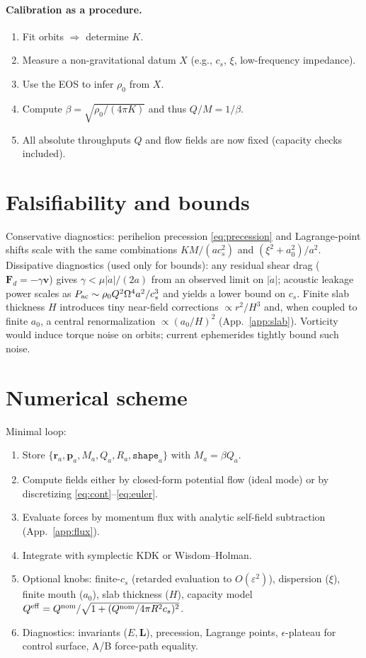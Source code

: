 \documentclass[11pt]{article}
\numberwithin{equation}{section}
\theoremstyle{plain}
\theoremstyle{remark}
\theoremstyle{definition}
\begin{document}
\paragraph{Calibration as a procedure.}
\begin{enumerate}[label=\arabic*)]
\item Fit orbits $\Rightarrow$ determine $K$.
\item Measure a non-gravitational datum $X$ (e.g., $c_s$, $\xi$, low-frequency impedance).
\item Use the EOS to infer $\rho_0$ from $X$.
\item Compute $\beta=\sqrt{\rho_0/(4\pi K)}$ and thus $Q/M=1/\beta$.
\item All absolute throughputs $Q$ and flow fields are now fixed (capacity checks included).
\end{enumerate}

\section{Falsifiability and bounds}
\label{sec:falsify}
Conservative diagnostics: perihelion precession \eqref{eq:precession} and Lagrange-point shifts scale with the same combinations $K M/(a c_s^2)$ and $(\xi^2+a_0^2)/a^2$. Dissipative diagnostics (used only for bounds): any residual shear drag ($\mathbf F_d=-\gamma\mathbf v$) gives $\gamma<\mu|\dot a|/(2a)$ from an observed limit on $|\dot a|$; acoustic leakage power scales as $P_{\rm ac}\sim \rho_0 Q^2\Omega^4 a^2/c_s^3$ and yields a lower bound on $c_s$. Finite slab thickness $H$ introduces tiny near-field corrections $\propto r^2/H^3$ and, when coupled to finite $a_0$, a central renormalization $\propto (a_0/H)^2$ (App.~\ref{app:slab}). Vorticity would induce torque noise on orbits; current ephemerides tightly bound such noise.

\section{Numerical scheme}
\label{sec:numerics}
Minimal loop:
\begin{enumerate}[label=\arabic*)]
\item Store $\{\mathbf r_a,\mathbf p_a,M_a,Q_a,R_a,\texttt{shape}_a\}$ with $M_a=\beta Q_a$.
\item Compute fields either by closed-form potential flow (ideal mode) or by discretizing \eqref{eq:cont}--\eqref{eq:euler}.
\item Evaluate forces by momentum flux with analytic self-field subtraction (App.~\ref{app:flux}).
\item Integrate with symplectic KDK or Wisdom--Holman.
\item Optional knobs: finite-$c_s$ (retarded evaluation to $O(\varepsilon^2)$), dispersion ($\xi$), finite mouth ($a_0$), slab thickness ($H$), capacity model $Q^{\rm eff}=Q^{\rm nom}/\sqrt{1+(Q^{\rm nom}/4\pi R^2c_s)^2}$.
\item Diagnostics: invariants ($E,\mathbf L$), precession, Lagrange points, $\epsilon$-plateau for control surface, A/B force-path equality.
\end{enumerate}
\end{document}
